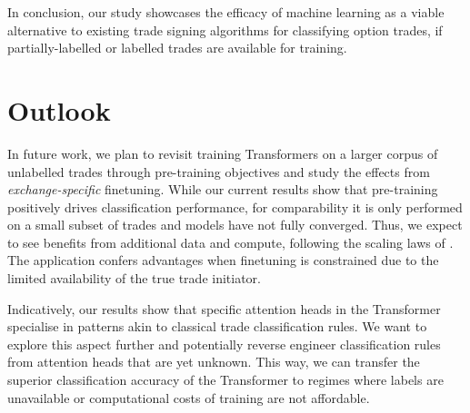 In conclusion, our study showcases the efficacy of machine learning as a viable alternative to existing trade signing algorithms for classifying option trades, if partially-labelled or labelled trades are available for training. %

\newpage
\section{Outlook}\label{sec:outlook}

In future work, we plan to revisit training Transformers on a larger corpus of unlabelled trades through pre-training objectives and study the effects from \emph{exchange-specific} finetuning. While our current results show that pre-training positively drives classification performance, for comparability it is only performed on a small subset of trades and models have not fully converged. Thus, we expect to see benefits from additional data and compute, following the scaling laws of \textcite[][7]{hoffmannTrainingComputeOptimalLarge2022}. The application confers advantages when finetuning is constrained due to the limited availability of the true trade initiator.

Indicatively, our results show that specific attention heads in the Transformer specialise in patterns akin to classical trade classification rules. We want to explore this aspect further and potentially reverse engineer classification rules from attention heads that are yet unknown. This way, we can transfer the superior classification accuracy of the Transformer to regimes where labels are unavailable or computational costs of training are not affordable.